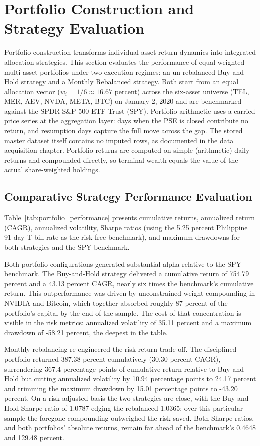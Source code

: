 \section{Portfolio Construction and Strategy Evaluation}

Portfolio construction transforms individual asset return dynamics into integrated allocation strategies. This section evaluates the performance of equal-weighted multi-asset portfolios under two execution regimes: an un-rebalanced Buy-and-Hold strategy and a Monthly Rebalanced strategy. Both start from an equal allocation vector ($w_i = 1/6 \approx 16.67$ percent) across the six-asset universe (TEL, MER, AEV, NVDA, META, BTC) on January 2, 2020 and are benchmarked against the SPDR S\&P 500 ETF Trust (SPY). Portfolio arithmetic uses a carried price series at the aggregation layer: days when the PSE is closed contribute no return, and resumption days capture the full move across the gap. The stored master dataset itself contains no imputed rows, as documented in the data acquisition chapter. Portfolio returns are computed on simple (arithmetic) daily returns and compounded directly, so terminal wealth equals the value of the actual share-weighted holdings.

\subsection{Comparative Strategy Performance Evaluation}

Table~\ref{tab:portfolio_performance} presents cumulative returns, annualized return (CAGR), annualized volatility, Sharpe ratios (using the 5.25 percent Philippine 91-day T-bill rate as the risk-free benchmark), and maximum drawdowns for both strategies and the SPY benchmark.



Both portfolio configurations generated substantial alpha relative to the SPY benchmark. The Buy-and-Hold strategy delivered a cumulative return of 754.79 percent and a 43.13 percent CAGR, nearly six times the benchmark's cumulative return. This outperformance was driven by unconstrained weight compounding in NVIDIA and Bitcoin, which together absorbed roughly 87 percent of the portfolio's capital by the end of the sample. The cost of that concentration is visible in the risk metrics: annualized volatility of 35.11 percent and a maximum drawdown of -58.21 percent, the deepest in the table.

Monthly rebalancing re-engineered the risk-return trade-off. The disciplined portfolio returned 387.38 percent cumulatively (30.30 percent CAGR), surrendering 367.4 percentage points of cumulative return relative to Buy-and-Hold but cutting annualized volatility by 10.94 percentage points to 24.17 percent and trimming the maximum drawdown by 15.01 percentage points to -43.20 percent. On a risk-adjusted basis the two strategies are close, with the Buy-and-Hold Sharpe ratio of 1.0787 edging the rebalanced 1.0365; over this particular sample the foregone compounding outweighed the risk saved. Both Sharpe ratios, and both portfolios' absolute returns, remain far ahead of the benchmark's 0.4648 and 129.48 percent.

